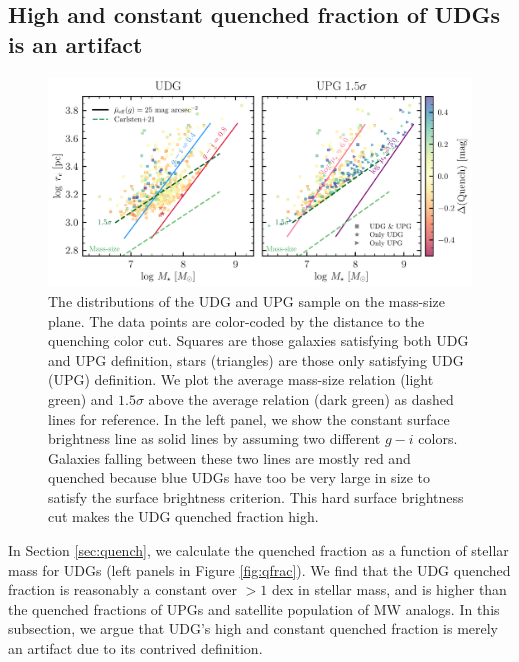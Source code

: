 \documentclass[twocolumn,astrosymb,twocolappendix]{aastex631}
\begin{document}
\begin{CJK*}{UTF8}{gbsn}
\subsection{High and constant quenched fraction of UDGs is an artifact}

\begin{figure}
	\vbox{ 
		\centering
		\includegraphics[width=1\linewidth]{mass_size_plane.pdf}
	}
    \caption{The distributions of the UDG and UPG sample on the mass-size plane. The data points are color-coded by the distance to the quenching color cut. Squares are those galaxies satisfying both UDG and UPG definition, stars (triangles) are those only satisfying UDG (UPG) definition.
    We plot the average mass-size relation (light green) and $1.5\sigma$ above the average relation (dark green) as dashed lines for reference. In the left panel, we show the constant surface brightness line as solid lines by assuming two different $g-i$ colors. Galaxies falling between these two lines are mostly red and quenched because blue UDGs have too be very large in size to satisfy the surface brightness criterion. This hard surface brightness cut makes the UDG quenched fraction high. 
    }
    \label{fig:mass_size}
\end{figure}


In Section \ref{sec:quench}, we calculate the quenched fraction as a function of stellar mass for UDGs (left panels in Figure \ref{fig:qfrac}). We find that the UDG quenched fraction is reasonably a constant over $>1$ dex in stellar mass, and is higher than the quenched fractions of UPGs and satellite population of MW analogs. In this subsection, we argue that UDG's high and constant quenched fraction is merely an artifact due to its contrived definition. 


\end{CJK*}
\end{document}
